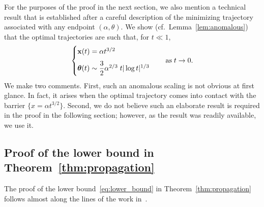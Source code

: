 \documentclass[AHL,Unicode,longabstracts]{cedram}
\newcommand{\bx}{\mathbf{x}}
\newcommand{\btheta}{\boldsymbol{\theta}}
\newcommand{\1}{\mathds{1}}
\begin{document}
For the purposes of the proof in the next section, we also mention a technical result that is established after a careful description of the minimizing trajectory associated with any endpoint $(\alpha,\theta)$. We show (cf.~Lemma~\ref{lem:anomalous}) that the optimal trajectories are such that, for $t \ll 1$,
\begin{equation}\label{eq:theta scaling sec 3}
\begin{cases}
\bx(t) = \alpha t^{3/2}
\medskip
\\
\btheta(t)\sim \dfrac32 \alpha^{2/3}\; t |\log t|^{1/3}
\end{cases}
\quad \text{as}\; t\to 0.
\end{equation}
We make two comments. First, such an anomalous scaling is not obvious at first glance. In fact, it arises when the optimal trajectory comes into contact with the barrier $\{x = \alpha t^{3/2}\}$. Second, we do not believe such an elaborate result is required in the proof in the following section; however, as the result was readily available, we use it.
\vspace{15pt}

\pagebreak

\subsection{Proof of the lower bound in Theorem~\ref{thm:propagation}}


The proof of the lower bound~\eqref{eq:lower_bound} in Theorem~\ref{thm:propagation} follows almost along the lines of the work in~\cite{BHR_acceleration}.
\end{document}
